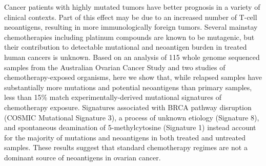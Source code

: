 Cancer patients with highly mutated tumors have better prognosis in a variety of clinical contexts. Part of this effect may be due to an increased number of T-cell neoantigens, resulting in more immunologically foreign tumors. Several mainstay chemotherapies including platinum compounds are known to be mutagenic, but their contribution to detectable mutational and neoantigen burden in treated human cancers is unknown. Based on an analysis of 115 whole genome sequenced samples from the Australian Ovarian Cancer Study and two studies of chemotherapy-exposed organisms, here we show that, while relapsed samples have substantially more mutations and potential neoantigens than primary samples, less than 15\% match experimentally-derived mutational signatures of chemotherapy exposure. Signatures associated with BRCA pathway disruption (COSMIC Mutational Signature 3), a process of unknown etiology (Signature 8), and spontaneous deamination of 5-methylcytosine (Signature 1) instead account for the majority of mutations and neoantigens in both treated and untreated samples. These results suggest that standard chemotherapy regimes are not a dominant source of neoantigens in ovarian cancer.

